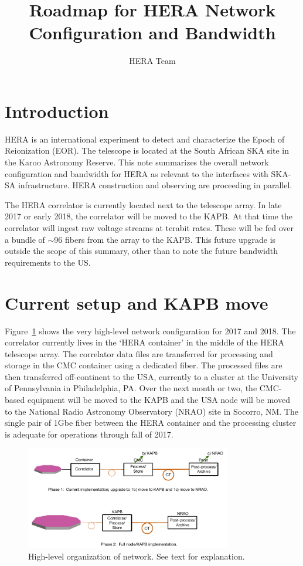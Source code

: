 \documentclass{article}
\begin{document}
\author{HERA Team}
\title{Roadmap for HERA Network Configuration and Bandwidth}
\maketitle

\section{Introduction}
HERA is an international experiment to detect and characterize the Epoch of
Reionization (EOR).  The telescope is located at the South African SKA site in
the Karoo Astronomy Reserve.  This note summarizes the overall network
configuration and bandwidth for HERA as relevant to the interfaces with SKA-SA
infrastructure.  HERA construction and observing are proceeding in parallel.

The HERA correlator is currently located next to the telescope array. In late 2017 or early 2018, the correlator will be moved to the KAPB. At that time the correlator will ingest raw voltage streams at terabit rates. These will be fed over a bundle of $\sim$96 fibers from the array to the KAPB. This future upgrade is outside the scope of this summary, other than to note the future bandwidth requirements to the US.

\section{Current setup and KAPB move}
Figure~\ref{fig:hi_level} shows the very high-level network configuration for
2017 and 2018.  The correlator currently lives in the `HERA container' in the
middle of the HERA telescope array.  The correlator data files are transferred for processing and storage in the CMC container using a dedicated fiber.  The processed files are then transferred off-continent to the USA, currently to a cluster at the University of Pennsylvania in Philadelphia, PA.  Over the next month or two, the CMC-based equipment will be moved to the KAPB and the USA node will be moved to the National Radio Astronomy Observatory (NRAO) site in Socorro, NM.  The single pair of 1Gbe fiber between the HERA container and the processing cluster is adequate for operations through fall of 2017.

\begin{figure}[H]
\includegraphics[width=0.8\textwidth]{network.pdf}
\centering
\caption{High-level organization of network.  See text for explanation.}
\label{fig:hi_level}
\end{figure}
\end{document}
